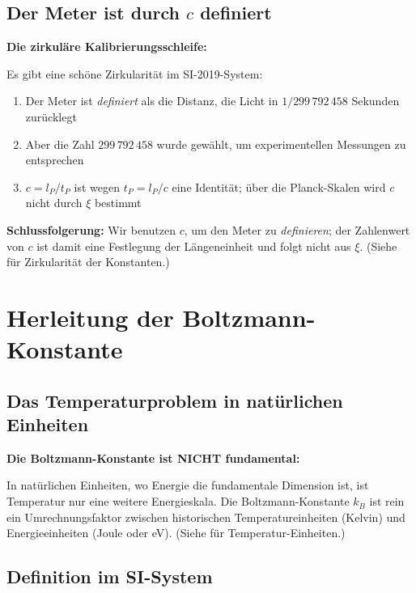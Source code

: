 	\subsection{Der Meter ist durch $c$ definiert}
	
	\begin{insight}
		\textbf{Die zirkuläre Kalibrierungsschleife:}
		
		Es gibt eine schöne Zirkularität im SI-2019-System:
		
		\begin{enumerate}
			\item Der Meter ist \emph{definiert} als die Distanz, die Licht in $1/299\,792\,458$ Sekunden zurücklegt
			\item Aber die Zahl $299\,792\,458$ wurde gewählt, um experimentellen Messungen zu entsprechen
			\item $c = l_P/t_P$ ist wegen $t_P = l_P/c$ eine Identität; über die Planck-Skalen wird $c$ nicht durch $\xi$ bestimmt
		\end{enumerate}
		
		\textbf{Schlussfolgerung:} Wir benutzen $c$, um den Meter zu \emph{definieren}; der Zahlenwert von $c$ ist damit eine Festlegung der Längeneinheit und folgt nicht aus $\xi$. (Siehe \cite{zirkularitaet-Konstanten_De} für Zirkularität der Konstanten.)
	\end{insight}
	
	\section{Herleitung der Boltzmann-Konstante}
	
	\subsection{Das Temperaturproblem in natürlichen Einheiten}
	
	\begin{warning}
		\textbf{Die Boltzmann-Konstante ist NICHT fundamental:}
		
		In natürlichen Einheiten, wo Energie die fundamentale Dimension ist, ist Temperatur nur eine weitere Energieskala. Die Boltzmann-Konstante $k_B$ ist rein ein Umrechnungsfaktor zwischen historischen Temperatureinheiten (Kelvin) und Energieeinheiten (Joule oder eV). (Siehe \cite{TempEinheitenCMB_De} für Temperatur-Einheiten.)
	\end{warning}
	
	\subsection{Definition im SI-System}
	
